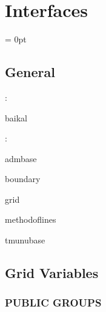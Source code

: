 
\section{Interfaces} 


\parskip = 0pt

\vspace{3mm} \subsection*{General}

: 

baikal
\vspace{2mm}

: 

admbase

boundary

grid

methodoflines

tmunubase
\vspace{2mm}
\subsection*{Grid Variables}
\vspace{5mm}\subsubsection{PUBLIC GROUPS}

\vspace{5mm}

